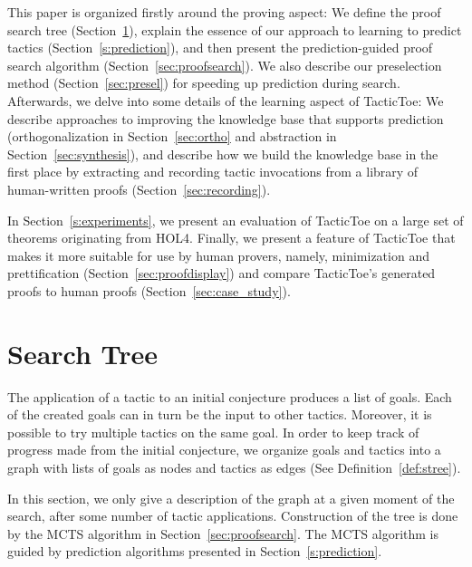 \documentclass[runningheads,a4paper,draft]{svjour3}
\def\holfour{\textsf{HOL4}\xspace}
\begin{document}
This paper is organized firstly around the proving aspect:
We define the proof search tree (Section~\ref{sec:prelim}), explain the essence of our approach to learning to predict tactics (Section~\ref{s:prediction}), and then present the prediction-guided proof search algorithm (Section~\ref{sec:proofsearch}).
We also describe our preselection method (Section~\ref{sec:presel}) for speeding up prediction during search.
Afterwards, we delve into some details of the learning aspect of TacticToe:
We describe approaches to improving the knowledge base that supports prediction (orthogonalization in Section~\ref{sec:ortho} and abstraction in Section~\ref{sec:synthesis}), and describe how we build the knowledge base in the first place by extracting and recording tactic invocations from a library of human-written proofs
(Section~\ref{sec:recording}).

In Section~\ref{s:experiments}, we present an evaluation of TacticToe on a large set of theorems originating from \holfour.
Finally, we present a feature of TacticToe that makes it more suitable for use by human provers, namely, minimization and prettification (Section~\ref{sec:proofdisplay}) and compare TacticToe's generated proofs to human proofs (Section~\ref{sec:case_study}).

\section{Search Tree}\label{sec:prelim}
The application of a tactic to an initial conjecture produces a list of goals.
Each of the created goals can in turn be the input to other tactics.
Moreover, it is possible to try multiple tactics on the same goal.
In order to keep track of progress made from the initial conjecture, we organize goals and tactics into a graph with lists of goals
as nodes and tactics as edges (See Definition~\ref{def:stree}).

In this section, we only give a description of the graph at a given
moment of the search, after some number of tactic applications.
Construction of the tree is done by the MCTS algorithm in
Section~\ref{sec:proofsearch}. The MCTS algorithm is guided by prediction
algorithms presented in Section~\ref{s:prediction}.
\end{document}
